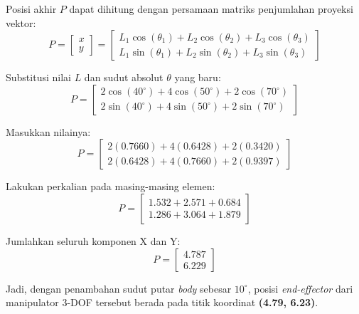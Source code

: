 \documentclass[12pt, a4paper, bahasa]{article}
\begin{document}
Posisi akhir $P$ dapat dihitung dengan persamaan matriks penjumlahan proyeksi vektor:
\begin{equation}
P = \begin{bmatrix} x \\ y \end{bmatrix} = 
\begin{bmatrix} 
L_1 \cos(\theta_1) + L_2 \cos(\theta_2) + L_3 \cos(\theta_3) \\ 
L_1 \sin(\theta_1) + L_2 \sin(\theta_2) + L_3 \sin(\theta_3) 
\end{bmatrix}
\end{equation}

Substitusi nilai $L$ dan sudut absolut $\theta$ yang baru:
\begin{equation}
P = \begin{bmatrix} 
2 \cos(40^\circ) + 4 \cos(50^\circ) + 2 \cos(70^\circ) \\ 
2 \sin(40^\circ) + 4 \sin(50^\circ) + 2 \sin(70^\circ) 
\end{bmatrix}
\end{equation}

Masukkan nilainya:
\begin{equation}
P = \begin{bmatrix} 
2(0.7660) + 4(0.6428) + 2(0.3420) \\ 
2(0.6428) + 4(0.7660) + 2(0.9397) 
\end{bmatrix}
\end{equation}

Lakukan perkalian pada masing-masing elemen:
\begin{equation}
P = \begin{bmatrix} 
1.532 + 2.571 + 0.684 \\ 
1.286 + 3.064 + 1.879 
\end{bmatrix}
\end{equation}

Jumlahkan seluruh komponen X dan Y:
\begin{equation}
P = \begin{bmatrix} 
4.787 \\ 
6.229 
\end{bmatrix}
\end{equation}

Jadi, dengan penambahan sudut putar \textit{body} sebesar $10^\circ$, posisi \textit{end-effector} dari manipulator 3-DOF tersebut berada pada titik koordinat \textbf{(4.79, 6.23)}.
\end{document}
